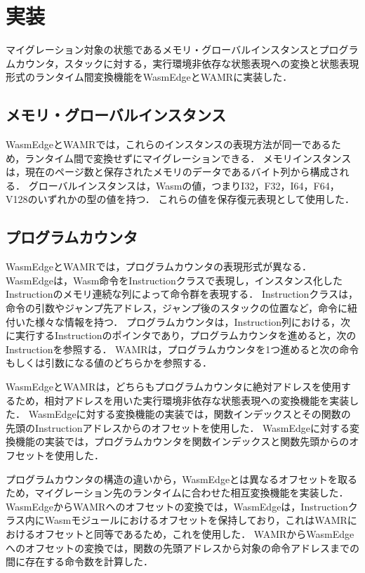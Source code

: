 \chapter{実装}
マイグレーション対象の状態であるメモリ・グローバルインスタンスとプログラムカウンタ，スタックに対する，実行環境非依存な状態表現への変換と状態表現形式のランタイム間変換機能をWasmEdgeとWAMRに実装した．

\section{メモリ・グローバルインスタンス}
WasmEdgeとWAMRでは，これらのインスタンスの表現方法が同一であるため，ランタイム間で変換せずにマイグレーションできる．
メモリインスタンスは，現在のページ数と保存されたメモリのデータであるバイト列から構成される．
グローバルインスタンスは，Wasmの値，つまりI32，F32，I64，F64，V128のいずれかの型の値を持つ．
これらの値を保存復元表現として使用した．

\section{プログラムカウンタ}
WasmEdgeとWAMRでは，プログラムカウンタの表現形式が異なる．
WasmEdgeは，Wasm命令をInstructionクラスで表現し，インスタンス化したInstructionのメモリ連続な列によって命令群を表現する．
Instructionクラスは，命令の引数やジャンプ先アドレス，ジャンプ後のスタックの位置など，命令に紐付いた様々な情報を持つ．
プログラムカウンタは，Instruction列における，次に実行するInstructionのポインタであり，プログラムカウンタを進めると，次のInstructionを参照する．
WAMRは，プログラムカウンタを1つ進めると次の命令もしくは引数になる値のどちらかを参照する．

WasmEdgeとWAMRは，どちらもプログラムカウンタに絶対アドレスを使用するため，相対アドレスを用いた実行環境非依存な状態表現への変換機能を実装した．
WasmEdgeに対する変換機能の実装では，関数インデックスとその関数の先頭のInstructionアドレスからのオフセットを使用した．
WasmEdgeに対する変換機能の実装では，プログラムカウンタを関数インデックスと関数先頭からのオフセットを使用した．

プログラムカウンタの構造の違いから，WasmEdgeとは異なるオフセットを取るため，マイグレーション先のランタイムに合わせた相互変換機能を実装した．
WasmEdgeからWAMRへのオフセットの変換では，WasmEdgeは，Instructionクラス内にWasmモジュールにおけるオフセットを保持しており，これはWAMRにおけるオフセットと同等であるため，これを使用した．
WAMRからWasmEdgeへのオフセットの変換では，関数の先頭アドレスから対象の命令アドレスまでの間に存在する命令数を計算した．

